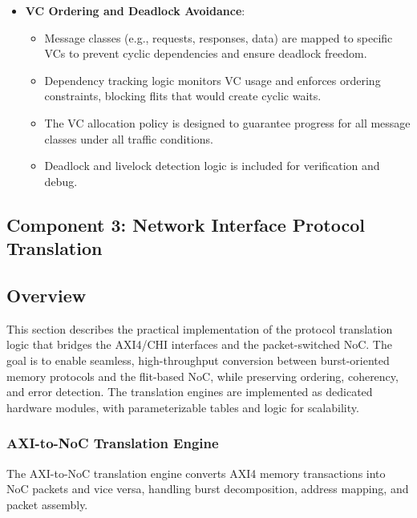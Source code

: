 \documentclass[11pt,a4paper]{article}
\begin{document}
\begin{itemize}
\begin{itemize}
    \end{itemize}
    \item \textbf{VC Ordering and Deadlock Avoidance}:
    \begin{itemize}
        \item Message classes (e.g., requests, responses, data) are mapped to specific VCs to prevent cyclic dependencies and ensure deadlock freedom.
        \item Dependency tracking logic monitors VC usage and enforces ordering constraints, blocking flits that would create cyclic waits.
        \item The VC allocation policy is designed to guarantee progress for all message classes under all traffic conditions.
        \item Deadlock and livelock detection logic is included for verification and debug.
    \end{itemize}
\end{itemize}

\subsection{Component 3: Network Interface Protocol Translation}

\subsection*{Overview}
This section describes the practical implementation of the protocol translation logic that bridges the AXI4/CHI interfaces and the packet-switched NoC. The goal is to enable seamless, high-throughput conversion between burst-oriented memory protocols and the flit-based NoC, while preserving ordering, coherency, and error detection. The translation engines are implemented as dedicated hardware modules, with parameterizable tables and logic for scalability.

\subsubsection{AXI-to-NoC Translation Engine}

The AXI-to-NoC translation engine converts AXI4 memory transactions into NoC packets and vice versa, handling burst decomposition, address mapping, and packet assembly.
\end{document}
